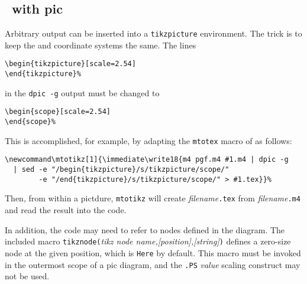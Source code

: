\subsection{\Tikz\ with pic}\label{Tikzwithpic:}
Arbitrary \pic output can be inserted into a {\tt \bsl{}tikzpicture} 
environment.  The trick is to keep the \pic and \Tikz coordinate systems
the same.
The lines

\vspace{\parsep}
\noindent\verb|\begin{tikzpicture}[scale=2.54]|\\
\noindent\verb|\end{tikzpicture}%|
\vspace{\parsep}

\noindent in the {\tt dpic -g} output must be changed to

\vspace{\parsep}
\noindent\verb|\begin{scope}[scale=2.54]|\\
\noindent\verb|\end{scope}%|
\vspace{\parsep}

\pagebreak
This is accomplished, for example, by adapting the {\tt \bsl{}mtotex}
macro of  as follows:

\vspace{\parsep}
\noindent
\verb^\newcommand\mtotikz[1]{\immediate\write18{m4 pgf.m4 #1.m4 | dpic -g^\\
\verb^  | sed -e "/begin{tikzpicture}/s/tikzpicture/scope/"^\\
\verb^        -e "/end{tikzpicture}/s/tikzpicture/scope/" > #1.tex}}%^\break

Then, from within a \Tikz pictdure, 
{\tt \bsl{}mtotikz\rbr}
will create {\sl filename}{\tt .tex} from {\sl filename}{\tt .m4}
and read the result into the \Tikz code.

In addition, the \Tikz code may need to refer to nodes defined in
the \pic diagram.
The included \Mfour macro
{\tt tikznode(}{\sl tikz node name,[position],[string]}{\tt)}
defines a zero-size \Tikz node at the given \pic position, which is
{\tt Here} by default.
This macro must be
invoked in the outermost scope of a pic diagram, and the
{\tt .PS} {\sl value} scaling construct may not be used. 

